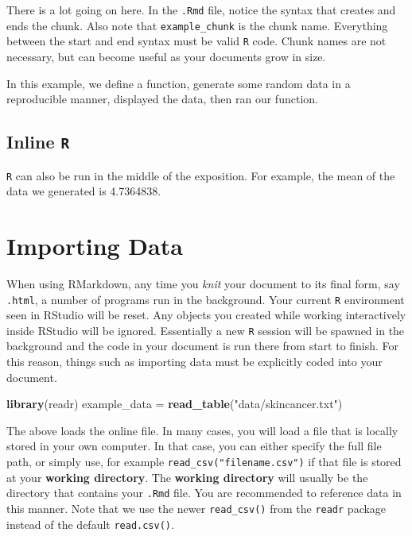 \documentclass[
]{book}
\newenvironment{Shaded}{\begin{snugshade}}{\end{snugshade}}
\newcommand{\FunctionTok}[1]{\textcolor[rgb]{0.13,0.29,0.53}{\textbf{#1}}}
\newcommand{\NormalTok}[1]{#1}
\newcommand{\OtherTok}[1]{\textcolor[rgb]{0.56,0.35,0.01}{#1}}
\newcommand{\StringTok}[1]{\textcolor[rgb]{0.31,0.60,0.02}{#1}}
\theoremstyle{definition}
\theoremstyle{definition}
\theoremstyle{definition}
\theoremstyle{definition}
\theoremstyle{remark}
\begin{document}
There is a lot going on here. In the \texttt{.Rmd} file, notice the syntax that creates and ends the chunk. Also note that \texttt{example\_chunk} is the chunk name. Everything between the start and end syntax must be valid \texttt{R} code. Chunk names are not necessary, but can become useful as your documents grow in size.

In this example, we define a function, generate some random data in a reproducible manner, displayed the data, then ran our function.

\hypertarget{inline-r}{%
\subsection{\texorpdfstring{Inline \texttt{R}}{Inline R}}\label{inline-r}}

\texttt{R} can also be run in the middle of the exposition. For example, the mean of the data we generated is 4.7364838.

\hypertarget{importing-data}{%
\section{Importing Data}\label{importing-data}}

When using RMarkdown, any time you \emph{knit} your document to its final form, say \texttt{.html}, a number of programs run in the background. Your current \texttt{R} environment seen in RStudio will be reset. Any objects you created while working interactively inside RStudio will be ignored. Essentially a new \texttt{R} session will be spawned in the background and the code in your document is run there from start to finish. For this reason, things such as importing data must be explicitly coded into your document.

\begin{Shaded}
\begin{Highlighting}[]
    \FunctionTok{library}\NormalTok{(readr)}
\NormalTok{    example\_data }\OtherTok{=} \FunctionTok{read\_table}\NormalTok{(}\StringTok{"data/skincancer.txt"}\NormalTok{)}
\end{Highlighting}
\end{Shaded}

The above loads the online file. In many cases, you will load a file that is locally stored in your own computer. In that case, you can either specify the full file path, or simply use, for example \texttt{read\_csv("filename.csv")} if that file is stored at your \textbf{working directory}. The \textbf{working directory} will usually be the directory that contains your \texttt{.Rmd} file. You are recommended to reference data in this manner. Note that we use the newer \texttt{read\_csv()} from the \texttt{readr} package instead of the default \texttt{read.csv()}.
\end{document}
